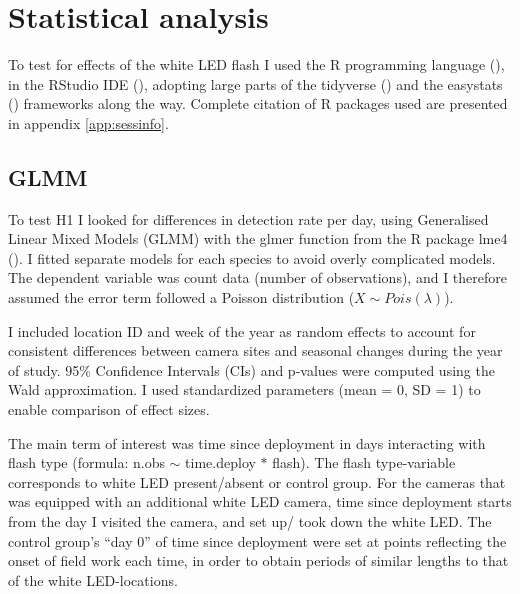 %
%
%
%
%


\section{Statistical analysis} %

To test for effects of the white LED flash I used the R programming language (\cite{RCoreTeam2020}), in the RStudio IDE (\cite{RStudioTeam2020a}), adopting large parts of the tidyverse (\cite{tidyverse}) and the easystats (\cite{easystats}) frameworks along the way. Complete citation of R packages used are presented in appendix \ref{app:sessinfo}. %


	\subsection*{GLMM}
To test H1 I looked for differences in detection rate per day, using Generalised Linear Mixed Models (GLMM) with the glmer function from the R package lme4 (\cite{lme4}).
I fitted separate models for each species to avoid overly complicated models. 
The dependent variable was count data (number of observations), and I therefore assumed the error term followed a Poisson distribution ($ X \sim Pois(\lambda) $).

I included location ID and week of the year as random effects to account for consistent differences between camera sites and seasonal changes during the year of study.
95\% Confidence Intervals (CIs) and p-values were computed using the Wald approximation.
I used standardized parameters (mean = 0, SD = 1) to enable comparison of effect sizes.

The main term of interest was time since deployment in days interacting with flash type (formula: n.obs $\sim$ time.deploy $\ast$ flash).
The flash type-variable corresponds to white LED present/absent or control group.
For the cameras that was equipped with an additional white LED camera, time since deployment starts from the day I visited the camera, and set up/ took down the white LED.
The control group’s “day 0” of time since deployment were set at points reflecting the onset of field work each time, in order to obtain periods of similar lengths to that of the white LED-locations.

